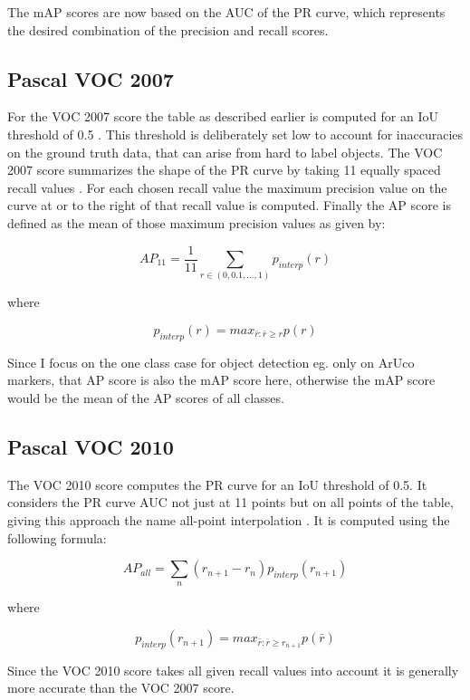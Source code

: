 \documentclass[10pt]{book}
\begin{document}
The \ac{mAP} scores are now based on the \ac{AUC} of the \ac{PR curve}, which represents the desired combination of the precision and recall scores.

\subsection{Pascal VOC 2007}

For the VOC 2007 score the table as described earlier is computed for an \ac{IoU} threshold of 0.5 \cite{everingham2010pascal}. This threshold is deliberately set low to account for inaccuracies on the ground truth data, that can arise from hard to label objects. The VOC 2007 score summarizes the shape of the \ac{PR curve} by taking 11 equally spaced recall values . For each chosen recall value the maximum precision value on the curve at or to the right of that recall value is computed. Finally the AP score is defined as the mean of those maximum precision values as given by:

$$AP_{11} = \frac{1}{11} \sum_{r\in(0,0.1,...,1)}p_{interp}(r)$$

where

$$p_{interp}(r) = max_{\bar{r} : \bar{r} \geq r}p(r)$$


Since I focus on the one class case for object detection eg. only on ArUco markers, that AP score is also the \ac{mAP} score here, otherwise the \ac{mAP} score would be the mean of the AP scores of all classes.

\subsection{Pascal VOC 2010}

The VOC 2010 score computes the \ac{PR curve} for an \ac{IoU} threshold of 0.5. It considers the \ac{PR curve} \ac{AUC} not just at 11 points but on all points of the table, giving this approach the name all-point interpolation \cite{padilla2020survey}. It is computed using the following formula:

$$AP_{all} = \sum_{n}(r_{n+1} - r_n)p_{interp}(r_{n+1})$$

where

$$p_{interp}(r_{n + 1}) = max_{\bar{r} : \bar{r} \geq r_{n+1}}p(\bar{r})$$

Since the VOC 2010 score takes all given recall values into account it is generally more accurate than the VOC 2007 score.
\end{document}
